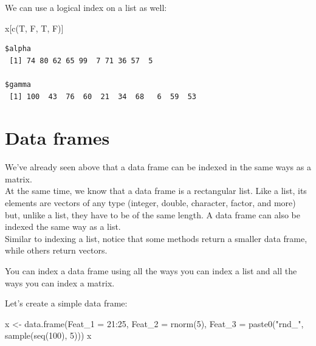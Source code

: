\documentclass[
]{book}
\newenvironment{Shaded}{\begin{snugshade}}{\end{snugshade}}
\newcommand{\AttributeTok}[1]{\textcolor[rgb]{0.77,0.63,0.00}{#1}}
\newcommand{\DecValTok}[1]{\textcolor[rgb]{0.00,0.00,0.81}{#1}}
\newcommand{\FunctionTok}[1]{\textcolor[rgb]{0.00,0.00,0.00}{#1}}
\newcommand{\NormalTok}[1]{#1}
\newcommand{\OtherTok}[1]{\textcolor[rgb]{0.56,0.35,0.01}{#1}}
\newcommand{\SpecialCharTok}[1]{\textcolor[rgb]{0.00,0.00,0.00}{#1}}
\newcommand{\StringTok}[1]{\textcolor[rgb]{0.31,0.60,0.02}{#1}}
\begin{document}
We can use a logical index on a list as well:

\begin{Shaded}
\begin{Highlighting}[]
\NormalTok{x[}\FunctionTok{c}\NormalTok{(T, F, T, F)]}
\end{Highlighting}
\end{Shaded}

\begin{verbatim}
$alpha
 [1] 74 80 62 65 99  7 71 36 57  5

$gamma
 [1] 100  43  76  60  21  34  68   6  59  53
\end{verbatim}

\hypertarget{indexdfs}{%
\section{Data frames}\label{indexdfs}}

We've already seen above that a data frame can be indexed in the same ways as a matrix.\\
At the same time, we know that a data frame is a rectangular list. Like a list, its elements are vectors of any type (integer, double, character, factor, and more) but, unlike a list, they have to be of the same length. A data frame can also be indexed the same way as a list.\\
Similar to indexing a list, notice that some methods return a smaller data frame, while others return vectors.

\begin{rmdtip}
You can index a data frame using all the ways you can index a list and
all the ways you can index a matrix.
\end{rmdtip}

Let's create a simple data frame:

\begin{Shaded}
\begin{Highlighting}[]
\NormalTok{x }\OtherTok{\textless{}{-}} \FunctionTok{data.frame}\NormalTok{(}\AttributeTok{Feat\_1 =} \DecValTok{21}\SpecialCharTok{:}\DecValTok{25}\NormalTok{,}
                \AttributeTok{Feat\_2 =} \FunctionTok{rnorm}\NormalTok{(}\DecValTok{5}\NormalTok{),}
                \AttributeTok{Feat\_3 =} \FunctionTok{paste0}\NormalTok{(}\StringTok{"rnd\_"}\NormalTok{, }\FunctionTok{sample}\NormalTok{(}\FunctionTok{seq}\NormalTok{(}\DecValTok{100}\NormalTok{), }\DecValTok{5}\NormalTok{)))}
\NormalTok{x}
\end{Highlighting}
\end{Shaded}
\end{document}
